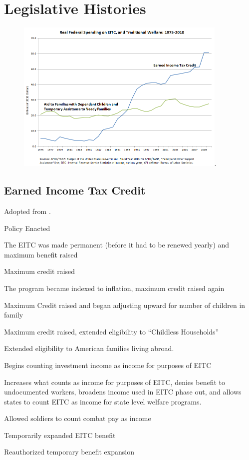 \documentclass[12pt]{article}
\begin{document}
\newpage
\section{Legislative Histories}
\begin{figure}[h!]
  \centering
\includegraphics[width=0.9\textwidth]{graph.png}.
\end{figure}
\subsection{Earned Income Tax Credit}
Adopted from \citet[Appendix 1]{scott2007}.
\begin{description}
\setlength{\itemsep}{-5pt}
\item[1976] Policy Enacted
\item[1978] The EITC was made permanent (before it had to be renewed yearly) and maximum benefit raised
\item[1984] Maximum credit raised
\item[1987] The program became indexed to inflation, maximum credit raised again 
\item[1990] Maximum Credit raised and began adjusting upward for number of children in family
\item[1993] Maximum credit raised, extended eligibility to ``Childless Households''
\item[1994] Extended eligibility to American families living abroad.
\item[1995] Begins counting investment income as income for purposes of EITC
\item[1996] Increases what counts as income for purposes of EITC, denies benefit to undocumented workers, broadens income used in EITC phase out, and allows states to count EITC as income for state level welfare programs.
\item[2004] Allowed soldiers to count combat pay as income
\item[2008] Temporarily expanded EITC benefit
\item[2010] Reauthorized temporary benefit expansion
\end{description}
\end{document}
